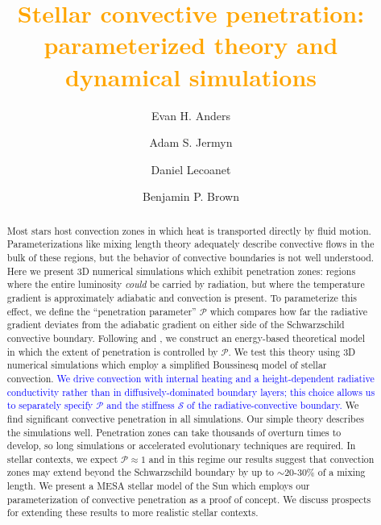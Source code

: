\documentclass[twocolumn, linenumbers]{aastex631}
\newcommand{\mP}{\ensuremath{\mathcal{P}}}
\newcommand{\mS}{\ensuremath{\mathcal{S}}}
\newcommand{\editone}[1]{\textcolor{orange}{#1}}
\newcommand{\edittwo}[1]{\textcolor{blue}{#1}}
\begin{document}
\title{\editone{Stellar convective penetration: parameterized theory and dynamical simulations}}
\author[0000-0002-3433-4733]{Evan H. Anders}
\author[0000-0001-5048-9973]{Adam S. Jermyn}
\author[0000-0002-7635-9728]{Daniel Lecoanet}
\author[0000-0001-8935-219X]{Benjamin P. Brown}


\begin{abstract}
Most stars host convection zones in which heat is transported directly by fluid motion.
Parameterizations like mixing length theory adequately describe convective flows in the bulk of these regions, but the behavior of convective boundaries is not well understood.
Here we present 3D numerical simulations which exhibit penetration zones: regions where the entire luminosity \emph{could} be carried by radiation, but where the temperature gradient is approximately adiabatic and convection is present.
To parameterize this effect, we define the ``penetration parameter'' $\mP$ which compares how far the radiative gradient deviates from the adiabatic gradient on either side of the Schwarzschild convective boundary.
Following \citet{roxburgh1989} and \citet{zahn1991}, we construct an energy-based theoretical model in which the extent of penetration is controlled by $\mP$.
We test this theory using 3D numerical simulations which employ a simplified Boussinesq model of stellar convection.
\edittwo{
    We drive convection with internal heating and a height-dependent radiative conductivity rather than in diffusively-dominated boundary layers; this choice allows us to separately specify $\mP$ and the stiffness $\mS$ of the radiative-convective boundary.
}We find significant convective penetration in all simulations.
Our simple theory describes the simulations well.
Penetration zones can take thousands of overturn times to develop, so long simulations or accelerated evolutionary techniques are required.
In stellar contexts, we expect $\mathcal{P} \approx 1$ and in this regime our results suggest that convection zones may extend beyond the Schwarzschild boundary by up to $\sim$20-30\% of a mixing length.
We present a MESA stellar model of the Sun which employs our parameterization of convective penetration as a proof of concept.
We discuss prospects for extending these results to more realistic stellar contexts.
\end{abstract}
\end{document}
